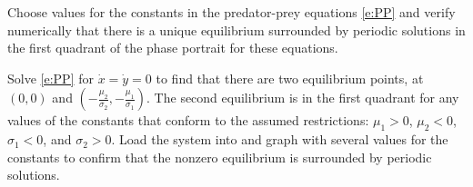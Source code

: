\documentclass{ximera}
\begin{document}
\begin{computerExercise} \label{c9.1.3}
Choose values for the constants in the predator-prey equations 
\eqref{e:PP} and verify numerically that there is a unique 
equilibrium surrounded by periodic solutions in the first 
quadrant of the phase portrait for these equations.

\begin{solution}

Solve \eqref{e:PP} for $\dot{x} = \dot{y} = 0$ to find that there are
two equilibrium points, at $(0,0)$ and $(-\frac{\mu_2}{\sigma_2},
-\frac{\mu_1}{\sigma_1})$.  The second equilibrium is in the first
quadrant for any values of the constants that conform to the assumed
restrictions: $\mu_1 > 0$, $\mu_2 < 0$, $\sigma_1 < 0$, and
$\sigma_2 > 0$.  Load the system into {\pplane} and graph with
several values for the constants to confirm that the nonzero
equilibrium is surrounded by periodic solutions.

\end{solution}
\end{computerExercise}
\end{document}
